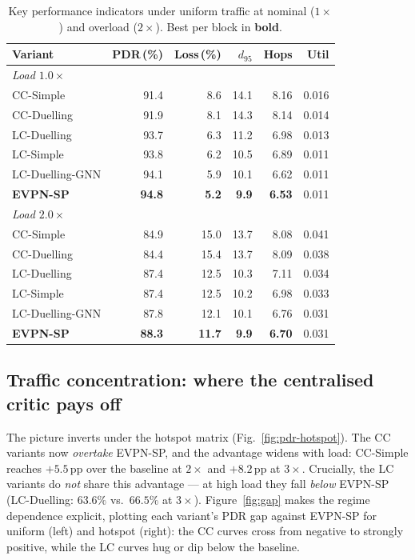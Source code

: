 \begin{table}[t]
  \centering
  \caption{Key performance indicators under uniform traffic at nominal
  ($1\times$) and overload ($2\times$). Best per block in \textbf{bold}.}
  \label{tab:kpi-uniform}
  \small
  \begin{tabular}{lrrrrr}
    \toprule
    Variant & PDR\,(\%) & Loss\,(\%) & $d_{95}$ & Hops & Util \\
    \midrule
    \multicolumn{6}{l}{\emph{Load $1.0\times$}}\\
    CC-Simple        & 91.4 & 8.6 & 14.1 & 8.16 & 0.016 \\
    CC-Duelling      & 91.9 & 8.1 & 14.3 & 8.14 & 0.014 \\
    LC-Duelling      & 93.7 & 6.3 & 11.2 & 6.98 & 0.013 \\
    LC-Simple        & 93.8 & 6.2 & 10.5 & 6.89 & 0.011 \\
    LC-Duelling-GNN  & 94.1 & 5.9 & 10.1 & 6.62 & 0.011 \\
    \textbf{EVPN-SP} & \textbf{94.8} & \textbf{5.2} & \textbf{9.9} & \textbf{6.53} & 0.011 \\
    \midrule
    \multicolumn{6}{l}{\emph{Load $2.0\times$}}\\
    CC-Simple        & 84.9 & 15.0 & 13.7 & 8.08 & 0.041 \\
    CC-Duelling      & 84.4 & 15.4 & 13.7 & 8.09 & 0.038 \\
    LC-Duelling      & 87.4 & 12.5 & 10.3 & 7.11 & 0.034 \\
    LC-Simple        & 87.4 & 12.5 & 10.2 & 6.98 & 0.033 \\
    LC-Duelling-GNN  & 87.8 & 12.1 & 10.1 & 6.76 & 0.031 \\
    \textbf{EVPN-SP} & \textbf{88.3} & \textbf{11.7} & \textbf{9.9} & \textbf{6.70} & 0.031 \\
    \bottomrule
  \end{tabular}
\end{table}

\subsection{Traffic concentration: where the centralised critic pays off}
\label{sec:hotspot}

The picture inverts under the hotspot matrix (Fig.~\ref{fig:pdr-hotspot}). The
CC variants now \emph{overtake} EVPN-SP, and the advantage widens with load:
CC-Simple reaches $+5.5$\,pp over the baseline at $2\times$ and
$+8.2$\,pp at $3\times$. Crucially, the LC variants do \emph{not} share this
advantage --- at high load they fall \emph{below} EVPN-SP
(LC-Duelling: $63.6\%$ vs.\ $66.5\%$ at $3\times$).
Figure~\ref{fig:gap} makes the regime dependence explicit, plotting each
variant's PDR gap against EVPN-SP for uniform (left) and hotspot (right): the CC
curves cross from negative to strongly positive, while the LC curves hug or
dip below the baseline.

